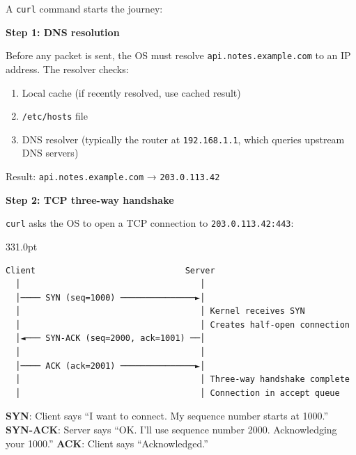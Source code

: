 A \texttt{curl} command starts the journey:

\begin{codebox}[short]

\begin{Shaded}
\begin{Highlighting}[]
\end{Highlighting}
\end{Shaded}

\end{codebox}

\noindent{}\textbf{Step 1: DNS resolution}

Before any packet is sent, the OS must resolve \texttt{api.notes.example.com} to an IP address. The resolver checks:

\begin{enumerate}
\def\labelenumi{\arabic{enumi}.}
\tightlist
\item
  Local cache (if recently resolved, use cached result)
\item
  \texttt{/etc/hosts} file
\item
  DNS resolver (typically the router at \texttt{192.168.1.1}, which queries upstream DNS servers)
\end{enumerate}

\noindent{}Result: \texttt{api.notes.example.com} → \texttt{203.0.113.42}

\textbf{Step 2: TCP three-way handshake}

\texttt{curl} asks the OS to open a TCP connection to \texttt{203.0.113.42:443}:

\begin{diagrambox}[short]{331.0pt}
\begin{Verbatim}[fontsize=\fontsize{9.0}{8.55}\selectfont]
Client                              Server
  │                                    │
  │──── SYN (seq=1000) ───────────────►│
  │                                    │ Kernel receives SYN
  │                                    │ Creates half-open connection
  │◄─── SYN-ACK (seq=2000, ack=1001) ──│
  │                                    │
  │──── ACK (ack=2001) ───────────────►│
  │                                    │ Three-way handshake complete
  │                                    │ Connection in accept queue
\end{Verbatim}
\end{diagrambox}

\noindent{}\textbf{SYN}: Client says ``I want to connect. My sequence number starts at 1000.''
\textbf{SYN-ACK}: Server says ``OK. I'll use sequence number 2000. Acknowledging your 1000.''
\textbf{ACK}: Client says ``Acknowledged.''

